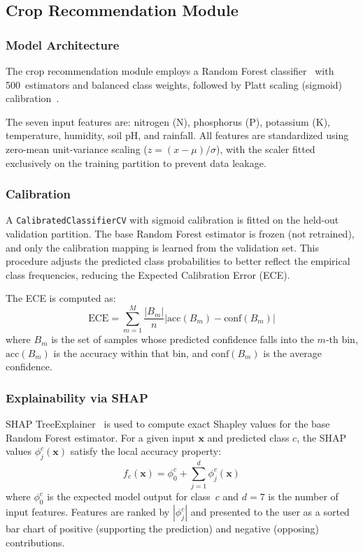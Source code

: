 \documentclass[conference]{IEEEtran}
\begin{document}
\subsection{Crop Recommendation Module}
\label{subsec:crop_method}

\subsubsection{Model Architecture}
The crop recommendation module employs a Random Forest classifier~\cite{breiman2001random} with 500~estimators and balanced class weights, followed by Platt scaling (sigmoid) calibration~\cite{platt1999probabilistic}.

The seven input features are: nitrogen (N), phosphorus (P), potassium (K), temperature, humidity, soil pH, and rainfall. All features are standardized using zero-mean unit-variance scaling ($z = (x - \mu) / \sigma$), with the scaler fitted exclusively on the training partition to prevent data leakage.

\subsubsection{Calibration}
A \texttt{CalibratedClassifierCV} with sigmoid calibration is fitted on the held-out validation partition. The base Random Forest estimator is frozen (not retrained), and only the calibration mapping is learned from the validation set. This procedure adjusts the predicted class probabilities to better reflect the empirical class frequencies, reducing the Expected Calibration Error (ECE).

The ECE is computed as:
\begin{equation}
  \text{ECE} = \sum_{m=1}^{M} \frac{|B_{m}|}{n} \left| \text{acc}(B_{m}) - \text{conf}(B_{m}) \right|
\end{equation}
where $B_{m}$ is the set of samples whose predicted confidence falls into the $m$-th bin, $\text{acc}(B_{m})$ is the accuracy within that bin, and $\text{conf}(B_{m})$ is the average confidence.

\subsubsection{Explainability via SHAP}
SHAP TreeExplainer~\cite{lundberg2017unified,lundberg2020local2global} is used to compute exact Shapley values for the base Random Forest estimator. For a given input $\mathbf{x}$ and predicted class $c$, the SHAP values $\phi_{j}^{c}(\mathbf{x})$ satisfy the local accuracy property:
\begin{equation}
  f_{c}(\mathbf{x}) = \phi_{0}^{c} + \sum_{j=1}^{d} \phi_{j}^{c}(\mathbf{x})
\end{equation}
where $\phi_{0}^{c}$ is the expected model output for class~$c$ and $d = 7$ is the number of input features. Features are ranked by $|\phi_{j}^{c}|$ and presented to the user as a sorted bar chart of positive (supporting the prediction) and negative (opposing) contributions.
\end{document}
